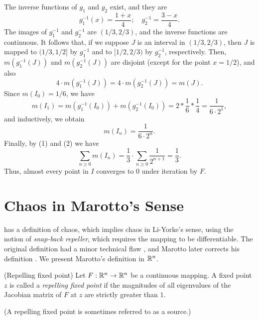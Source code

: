 \documentclass[10pt,draft,twoside]{book}
\begin{document}
\begin{example}
The inverse functions of $g_1$ and $g_2$ exist, and they are
\begin{equation*}
  g_1^{-1}(x) = \frac{1+x}{4}; \quad g_2^{-1} = \frac{3-x}{4}.
\end{equation*}
The images of $g_1^{-1}$ and $g_2^{-1}$ are $(1/3,2/3)$, and the inverse functions are continuous.
It follows that, if we suppose $J$ is an interval in $(1/3,2/3)$, then $J$ is mapped to $(1/3,1/2]$ by $g_1^{-1}$ and to $[1/2,2/3)$ by $g_2^{-1}$, respectively.
Then, $m(g_1^{-1}(J))$ and $m(g_2^{-1}(J))$ are disjoint (except for the point $x = 1/2$), and also
\begin{equation*}
  4 \cdot m(g_1^{-1}(J)) = 4 \cdot m(g_2^{-1}(J)) = m(J).
\end{equation*}
Since $m(I_0) = 1/6$, we have
\begin{equation*}
  m(I_1) 
  = m(g_1^{-1}(I_0)) + m(g_2^{-1}(I_0))
  = 2 * \frac{1}{6} * \frac{1}{4}
  = \frac{1}{6\cdot 2^1},
\end{equation*}
and inductively, we obtain
\begin{equation*}
  m(I_n) = \frac{1}{6 \cdot 2^n}.
\end{equation*}
%
Finally, by (1) and (2) we have
\begin{equation*}
  \sum\limits_{n\geq 0} m(I_n)
  = \frac{1}{3} \cdot \sum\limits_{n\geq 0} \frac{1}{2^{n+1}}
  = \frac{1}{3}.
\end{equation*}
Thus, almost every point in $I$ converges to 0 under iteration by $F$.
\end{example}


\section{Chaos in Marotto's Sense}
\citet{marotto1} has a definition of chaos, which implies chaos in Li-Yorke's sense, using the notion of \textit{snap-back repeller}, which requires the mapping to be differentiable.
The original definition had a minor technical flaw \citep{shi}, and Marotto later corrects his definition \citep{marotto2}.
We present Marotto's definition in $\mathbb{R}^n$.
\begin{definition}
  (Repelling fixed point)
  Let $F: \mathbb{R}^n \to \mathbb{R}^n$ be a continuous mapping. 
  A fixed point $z$ is called a \textit{repelling fixed point} if the magnitudes of all eigenvalues of the Jacobian matrix of $F$ at $z$ are strictly greater than $1$.
\end{definition}
(A repelling fixed point is sometimes referred to as a source.)
\end{document}
